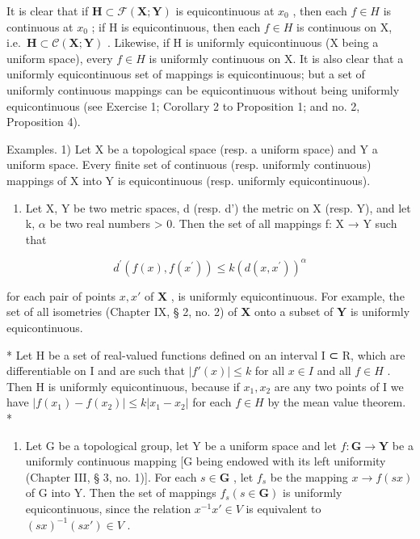 It is clear that if \(\mathbf{H}\subset\mathcal{F}(\mathbf{X};\mathbf{Y})\) is equicontinuous at \(x_{0}\) , then each \(f\in H\) is continuous at \(x_{0}\) ; if H is equicontinuous, then each \(f\in H\) is continuous on X, i.e.~\(\mathbf{H}\subset\mathcal{C}(\mathbf{X};\mathbf{Y})\) . Likewise, if H is uniformly equicontinuous (X being a uniform space), every \(f\in H\) is uniformly continuous on X. It is also clear that a uniformly equicontinuous set of mappings is equicontinuous; but a set of uniformly continuous mappings can be equicontinuous without being uniformly equicontinuous (see Exercise 1; Corollary 2 to Proposition 1; and no. 2, Proposition 4).

Examples. 1) Let X be a topological space (resp. a uniform space) and Y a uniform space. Every finite set of continuous (resp. uniformly continuous) mappings of X into Y is equicontinuous (resp. uniformly equicontinuous).

\begin{enumerate}
\def\labelenumi{\arabic{enumi})}
\setcounter{enumi}{1}
\tightlist
\item
  Let X, Y be two metric spaces, d (resp. d') the metric on X (resp. Y), and let k, \(\alpha\) be two real numbers \textgreater{} 0. Then the set of all mappings f: X → Y such that
\end{enumerate}

\[
d ^ {\prime} (f (x), f (x ^ {\prime})) \leqslant k (d (x, x ^ {\prime})) ^ {\alpha}
\]

for each pair of points \(x, x'\) of \(\mathbf{X}\) , is uniformly equicontinuous. For example, the set of all isometries (Chapter IX, § 2, no. 2) of \(\mathbf{X}\) onto a subset of \(\mathbf{Y}\) is uniformly equicontinuous.

* Let H be a set of real-valued functions defined on an interval I ⊂ R, which are differentiable on I and are such that \(|f'(x)| \leqslant k\) for all \(x \in I\) and all \(f \in H\) . Then H is uniformly equicontinuous, because if \(x_{1}, x_{2}\) are any two points of I we have \(|f(x_{1}) - f(x_{2})| \leqslant k |x_{1} - x_{2}|\) for each \(f \in H\) by the mean value theorem. *

\begin{enumerate}
\def\labelenumi{\arabic{enumi})}
\setcounter{enumi}{2}
\tightlist
\item
  Let G be a topological group, let Y be a uniform space and let \(f: \mathbf{G} \to \mathbf{Y}\) be a uniformly continuous mapping {[}G being endowed with its left uniformity (Chapter III, § 3, no. 1){]}. For each \(s \in \mathbf{G}\) , let \(f_s\) be the mapping \(x \to f(sx)\) of G into Y. Then the set of mappings \(f_s(s \in \mathbf{G})\) is uniformly equicontinuous, since the relation \(x^{-1}x' \in V\) is equivalent to \((sx)^{-1}(sx') \in V\) .
\end{enumerate}

